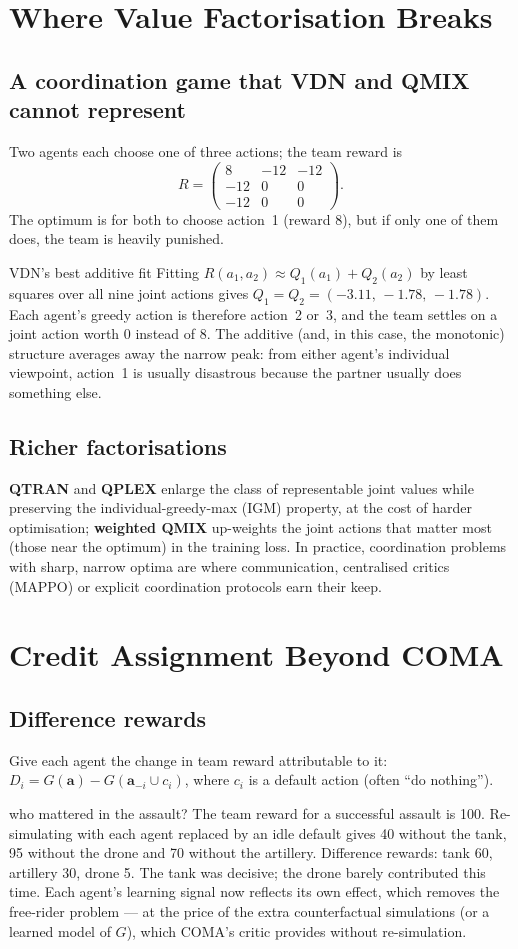 \documentclass[11pt]{article}
\begin{document}
\section{Where Value Factorisation Breaks}
\subsection{A coordination game that VDN and QMIX cannot represent}
Two agents each choose one of three actions; the team reward is
\[R=\begin{pmatrix}8&-12&-12\\-12&0&0\\-12&0&0\end{pmatrix}.\]
The optimum is for both to choose action~1 (reward 8), but if only one of them does, the team is heavily punished.
\begin{example}{VDN's best additive fit}
Fitting $R(a_1,a_2)\approx Q_1(a_1)+Q_2(a_2)$ by least squares over all nine joint actions gives $Q_1=Q_2=(-3.11,\,-1.78,\,-1.78)$. Each agent's greedy action is therefore action~2 or~3, and the team settles on a joint action worth 0 instead of 8. The additive (and, in this case, the monotonic) structure averages away the narrow peak: from either agent's individual viewpoint, action~1 is usually disastrous because the partner usually does something else.
\end{example}
\subsection{Richer factorisations}
\textbf{QTRAN} and \textbf{QPLEX} enlarge the class of representable joint values while preserving the individual-greedy-max (IGM) property, at the cost of harder optimisation; \textbf{weighted QMIX} up-weights the joint actions that matter most (those near the optimum) in the training loss. In practice, coordination problems with sharp, narrow optima are where communication, centralised critics (MAPPO) or explicit coordination protocols earn their keep.

\section{Credit Assignment Beyond COMA}
\subsection{Difference rewards}
Give each agent the change in team reward attributable to it: $D_i=G(\mathbf a)-G(\mathbf a_{-i}\cup c_i)$, where $c_i$ is a default action (often ``do nothing'').
\begin{example}{who mattered in the assault?}
The team reward for a successful assault is 100. Re-simulating with each agent replaced by an idle default gives 40 without the tank, 95 without the drone and 70 without the artillery. Difference rewards: tank 60, artillery 30, drone 5. The tank was decisive; the drone barely contributed this time. Each agent's learning signal now reflects its own effect, which removes the free-rider problem --- at the price of the extra counterfactual simulations (or a learned model of $G$), which COMA's critic provides without re-simulation.
\end{example}
\end{document}
